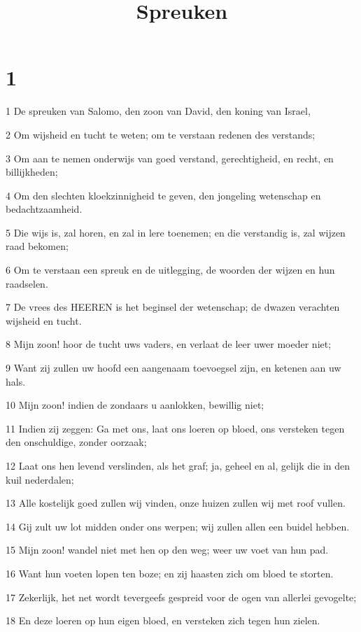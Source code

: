 

\title{Spreuken}



\chapter{1}

\par 1 De spreuken van Salomo, den zoon van David, den koning van Israel,
\par 2 Om wijsheid en tucht te weten; om te verstaan redenen des verstands;
\par 3 Om aan te nemen onderwijs van goed verstand, gerechtigheid, en recht, en billijkheden;
\par 4 Om den slechten kloekzinnigheid te geven, den jongeling wetenschap en bedachtzaamheid.
\par 5 Die wijs is, zal horen, en zal in lere toenemen; en die verstandig is, zal wijzen raad bekomen;
\par 6 Om te verstaan een spreuk en de uitlegging, de woorden der wijzen en hun raadselen.
\par 7 De vrees des HEEREN is het beginsel der wetenschap; de dwazen verachten wijsheid en tucht.
\par 8 Mijn zoon! hoor de tucht uws vaders, en verlaat de leer uwer moeder niet;
\par 9 Want zij zullen uw hoofd een aangenaam toevoegsel zijn, en ketenen aan uw hals.
\par 10 Mijn zoon! indien de zondaars u aanlokken, bewillig niet;
\par 11 Indien zij zeggen: Ga met ons, laat ons loeren op bloed, ons versteken tegen den onschuldige, zonder oorzaak;
\par 12 Laat ons hen levend verslinden, als het graf; ja, geheel en al, gelijk die in den kuil nederdalen;
\par 13 Alle kostelijk goed zullen wij vinden, onze huizen zullen wij met roof vullen.
\par 14 Gij zult uw lot midden onder ons werpen; wij zullen allen een buidel hebben.
\par 15 Mijn zoon! wandel niet met hen op den weg; weer uw voet van hun pad.
\par 16 Want hun voeten lopen ten boze; en zij haasten zich om bloed te storten.
\par 17 Zekerlijk, het net wordt tevergeefs gespreid voor de ogen van allerlei gevogelte;
\par 18 En deze loeren op hun eigen bloed, en versteken zich tegen hun zielen.
